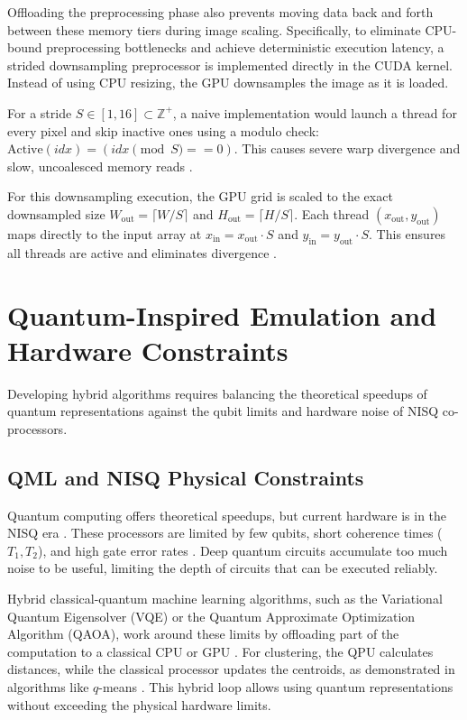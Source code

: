 Offloading the preprocessing phase also prevents moving data back and forth between these memory tiers during image scaling. Specifically, to eliminate CPU-bound preprocessing bottlenecks and achieve deterministic execution latency, a strided downsampling preprocessor is implemented directly in the CUDA kernel. Instead of using CPU resizing, the GPU downsamples the image as it is loaded.

\label{subsect:downsampling_theory}For a stride $S \in [1, 16] \subset \mathbb{Z}^+$, a naive implementation would launch a thread for every pixel and skip inactive ones using a modulo check: $\text{Active}(idx) = (idx \pmod{S} == 0)$. This causes severe warp divergence \cite{cook2012cuda} and slow, uncoalesced memory reads \cite{CudaGuide}.

For this downsampling execution, the GPU grid is scaled to the exact downsampled size $W_{\text{out}} = \lceil W/S \rceil$ and $H_{\text{out}} = \lceil H/S \rceil$. Each thread $(x_{\text{out}}, y_{\text{out}})$ maps directly to the input array at $x_{\text{in}} = x_{\text{out}} \cdot S$ and $y_{\text{in}} = y_{\text{out}} \cdot S$. This ensures all threads are active and eliminates divergence \cite{CudaGuide, cook2012cuda}.

\section{Quantum-Inspired Emulation and Hardware Constraints}
Developing hybrid algorithms requires balancing the theoretical speedups of quantum representations against the qubit limits and hardware noise of NISQ co-processors.

\subsection{QML and NISQ Physical Constraints}
Quantum computing offers theoretical speedups, but current hardware is in the NISQ era \cite{preskill2018quantum}. These processors are limited by few qubits, short coherence times ($T_1, T_2$), and high gate error rates \cite{bharti2022noisy,koch2020demonstrating}. Deep quantum circuits accumulate too much noise to be useful, limiting the depth of circuits that can be executed reliably.

Hybrid classical-quantum machine learning algorithms, such as the Variational Quantum Eigensolver (VQE) or the Quantum Approximate Optimization Algorithm (QAOA), work around these limits by offloading part of the computation to a classical CPU or GPU \cite{mccaskey2018hybrid}. For clustering, the QPU calculates distances, while the classical processor updates the centroids, as demonstrated in algorithms like $q$-means \cite{kerenidis2019q, lloyd2013quantum}. This hybrid loop allows using quantum representations without exceeding the physical hardware limits. \cite{preskill2018quantum}

